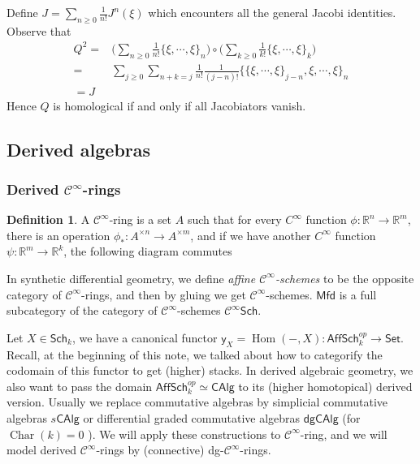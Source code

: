 \documentclass[12pt]{amsart}
\theoremstyle{definition}
\newtheorem{defn}[thm]{Definition}
\theoremstyle{remark}
\numberwithin{equation}{section}
\newcommand{\cinf}{{\mathcal C}^{\infty}}
\newcommand{\R}{{\mathbb{R}}}
\newcommand{\1}{{\mathbb{1}}}
\newcommand{\y}{\mathsf{y}}
\newcommand{\set}{\mathsf{Set}}
\newcommand{\mfd}{\mathsf{Mfd}}
\newcommand{\sch}{\mathsf{Sch}}
\newcommand{\aff}{\mathsf{Aff}}\newcommand{\alg}{\mathsf{Alg}}
\newcommand{\calg}{\mathsf{CAlg}}
\newcommand{\dgcalg}{\mathsf{dgCAlg}}
\newcommand{\Char}{\operatorname{Char}}
\newcommand{\Hom}{\operatorname{Hom}}
\begin{document}
Define $J=\sum_{n \ge 0} \frac{1}{n!} J^n(\xi)$ which encounters all the general Jacobi identities. Observe that
\begin{align*}
Q^2=&\bigg( \sum_{n \ge 0} \frac{1}{n!}\{\xi, \cdots, \xi \}_n\bigg)\circ \bigg( \sum_{k \ge 0} \frac{1}{k!}\{\xi, \cdots, \xi \}_k\bigg)\\
=&\sum_{j\ge 0} \sum_{n+k=j}\frac{1}{n!}\frac{1}{(j-n)!}\big\{ \{\xi,\cdots, \xi \}_{j-n}, \xi,\cdots ,\xi  \big\}_{n} \\
=J
\end{align*}
Hence $Q$ is homological if and only if all Jacobiators vanish. 
\subsection{Derived algebras}
\subsubsection{Derived $\cinf$-rings}

\begin{defn}
	A $\cinf$-ring is a set $A$ such that for every $C^{\infty}$ function $\phi: \R^n\to \R^m$, there is an operation $\phi_*: A^{\times n}\to A^{\times m}$, and if we have another $C^{\infty}$ function $\psi: \R^m \to \R^k$, the following diagram commutes
	\begin{center}
	\end{center}
\end{defn}

In synthetic differential geometry, we define {\it affine $\cinf$-schemes} to be the opposite category of $\cinf$-rings, and then by gluing we get $\cinf$-schemes. $\mfd$ is a full subcategory of the category of $\cinf$-schemes $\cinf\sch$.

Let $X\in \sch_k$, we have a canonical functor $\y_X=\Hom(-,X): \aff\sch_k^{op}\to \set$. Recall, at the beginning of this note, we talked about how to categorify the codomain of this functor to get (higher) stacks. In derived algebraic geometry, we also want to pass the domain  $\aff\sch_k^{op}\simeq \calg$ to its (higher homotopical) derived version. Usually we replace commutative algebras by simplicial commutative algebras $s\calg$ or differential graded commutative algebras $\dgcalg$ (for $\Char(k)=0$ ). We will apply these constructions to $\cinf$-ring, and we will model derived $\cinf$-rings by (connective) dg-$\cinf$-rings.
\end{document}
